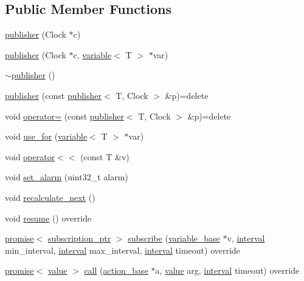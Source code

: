 \subsection*{Public Member Functions}
\begin{DoxyCompactItemize}
\item 
\hyperlink{classtelegen_1_1publisher_a6fc6fb74fe2e1db1de31a9ef434a851f}{publisher} (Clock $\ast$c)
\item 
\hyperlink{classtelegen_1_1publisher_adc45d3b53b7532c8b0d76673ed32f4f3}{publisher} (Clock $\ast$c, \hyperlink{classtelegen_1_1variable}{variable}$<$ T $>$ $\ast$var)
\item 
\hyperlink{classtelegen_1_1publisher_a075945686aca7ef00a37783cc5079caf}{$\sim$publisher} ()
\item 
\hyperlink{classtelegen_1_1publisher_a8b7695fbea0b0ebb4e850eb1cc1a9fd5}{publisher} (const \hyperlink{classtelegen_1_1publisher}{publisher}$<$ T, Clock $>$ \&p)=delete
\item 
void \hyperlink{classtelegen_1_1publisher_ad2111d40973f4bfd5d4bde64d736eb84}{operator=} (const \hyperlink{classtelegen_1_1publisher}{publisher}$<$ T, Clock $>$ \&p)=delete
\item 
void \hyperlink{classtelegen_1_1publisher_a3388c9262a15195d55f224bdd0606e96}{use\+\_\+for} (\hyperlink{classtelegen_1_1variable}{variable}$<$ T $>$ $\ast$var)
\item 
void \hyperlink{classtelegen_1_1publisher_a093ed11e3e992e0980dada475b154e86}{operator$<$$<$} (const T \&v)
\item 
void \hyperlink{classtelegen_1_1publisher_a551b3f77b7ac7be7157cd7cf78cc2983}{set\+\_\+alarm} (uint32\+\_\+t alarm)
\item 
void \hyperlink{classtelegen_1_1publisher_af83e62cfa8e9bbd0b43716ce7d802547}{recalculate\+\_\+next} ()
\item 
void \hyperlink{classtelegen_1_1publisher_a143382f6ff9560be4839c50b3f1dc86c}{resume} () override
\item 
\hyperlink{namespacetelegen_a9dd802bb5d30cf96b0c616750d43ae86}{promise}$<$ \hyperlink{namespacetelegen_a27c822534a5231fe1c523c81e8768afb}{subscription\+\_\+ptr} $>$ \hyperlink{classtelegen_1_1publisher_abb9ec30f9b0859e34111dc02fe8b52bd}{subscribe} (\hyperlink{classtelegen_1_1variable__base}{variable\+\_\+base} $\ast$v, \hyperlink{namespacetelegen_ad925de2d0a99bc43918533abf0457344}{interval} min\+\_\+interval, \hyperlink{namespacetelegen_ad925de2d0a99bc43918533abf0457344}{interval} max\+\_\+interval, \hyperlink{namespacetelegen_ad925de2d0a99bc43918533abf0457344}{interval} timeout) override
\item 
\hyperlink{namespacetelegen_a9dd802bb5d30cf96b0c616750d43ae86}{promise}$<$ \hyperlink{classtelegen_1_1value}{value} $>$ \hyperlink{classtelegen_1_1publisher_a3b5f514d064a6bca0209753dd724a2a7}{call} (\hyperlink{classtelegen_1_1action__base}{action\+\_\+base} $\ast$a, \hyperlink{classtelegen_1_1value}{value} arg, \hyperlink{namespacetelegen_ad925de2d0a99bc43918533abf0457344}{interval} timeout) override
\end{DoxyCompactItemize}
